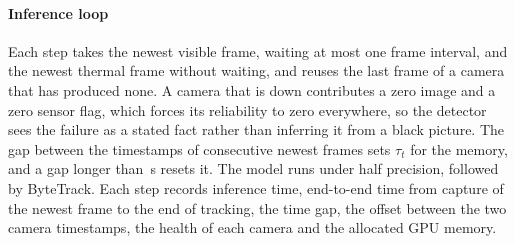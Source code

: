 \paragraph{Inference loop}
Each step takes the newest visible frame, waiting at most one frame interval, and the newest thermal frame without waiting, and reuses the last frame of a camera that has produced none. A camera that is down contributes a zero image and a zero sensor flag, which forces its reliability to zero everywhere, so the detector sees the failure as a stated fact rather than inferring it from a black picture. The gap between the timestamps of consecutive newest frames sets $\tau_t$ for the memory, and a gap longer than \cfgResetS{}\,s resets it. The model runs under half precision, followed by ByteTrack. Each step records inference time, end-to-end time from capture of the newest frame to the end of tracking, the time gap, the offset between the two camera timestamps, the health of each camera and the allocated GPU memory.


